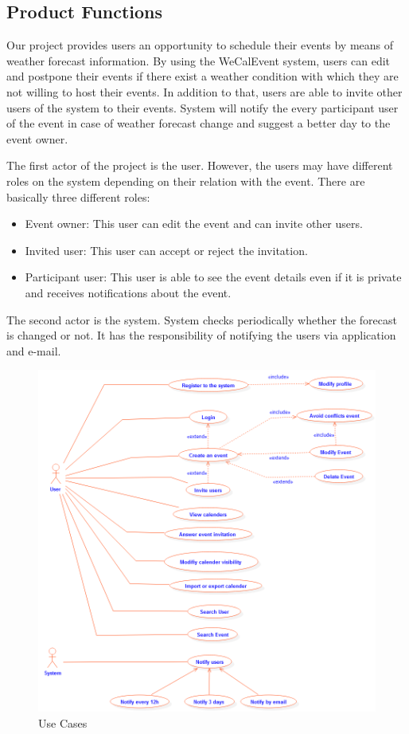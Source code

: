 \subsection{Product Functions}
\quad Our project provides users an opportunity to schedule their events by means of weather forecast information. By using the WeCalEvent system, users can edit and postpone their events if there exist a weather condition with which they are not willing to host their events. In addition to that, users are able to invite other users of the system to their events. System will notify the every participant user of the event in case of weather forecast change and suggest a better day to the event owner.
\par The first actor of the project is the user. However, the users may have different roles on the system depending on their relation with the event. There are basically three different roles:
\begin{itemize}
  \item Event owner: This user can edit the event and can invite other users.
  \item Invited user: This user can accept or reject the invitation.
  \item Participant user: This user is able to see the event details even if it is private and receives notifications about the event.
\end{itemize}
\par The second actor is the system. System checks periodically whether the forecast is changed or not. It has the responsibility of notifying the users via application and e-mail.
\newpage
\begin{figure}[tbh]
  \begin{center}
  \includegraphics[width=160mm]{UseCases}
  \caption{Use Cases}\label{Fig 2:}
  \end{center}
\end{figure}

